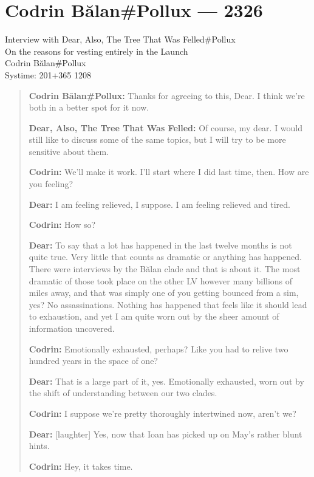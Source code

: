 \hypertarget{codrin-bux103lanpollux-2326}{%
\chapter{Codrin Bălan\#Pollux — 2326}\label{codrin-bux103lanpollux-2326}}

Interview with Dear, Also, The Tree That Was Felled\#Pollux\\
On the reasons for vesting entirely in the Launch\\
Codrin Bălan\#Pollux\\
Systime: 201+365 1208

\begin{quote}
\textbf{Codrin Bălan\#Pollux:} Thanks for agreeing to this, Dear. I think we're both in a better spot for it now.

\textbf{Dear, Also, The Tree That Was Felled:} Of course, my dear. I would still like to discuss some of the same topics, but I will try to be more sensitive about them.

\textbf{Codrin:} We'll make it work. I'll start where I did last time, then. How are you feeling?

\textbf{Dear:} I am feeling relieved, I suppose. I am feeling relieved and tired.

\textbf{Codrin:} How so?

\textbf{Dear:} To say that a lot has happened in the last twelve months is not quite true. Very little that counts as dramatic or anything has happened. There were interviews by the Bălan clade and that is about it. The most dramatic of those took place on the other LV however many billions of miles away, and that was simply one of you getting bounced from a sim, yes? No assassinations. Nothing has happened that feels like it should lead to exhaustion, and yet I am quite worn out by the sheer amount of information uncovered.

\textbf{Codrin:} Emotionally exhausted, perhaps? Like you had to relive two hundred years in the space of one?

\textbf{Dear:} That is a large part of it, yes. Emotionally exhausted, worn out by the shift of understanding between our two clades.

\textbf{Codrin:} I suppose we're pretty thoroughly intertwined now, aren't we?

\textbf{Dear:} {[}laughter{]} Yes, now that Ioan has picked up on May's rather blunt hints.

\textbf{Codrin:} Hey, it takes time.


\end{quote}
